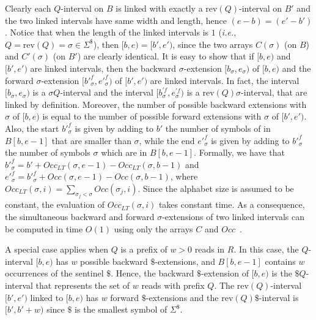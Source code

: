 \documentclass[runningheads,envcountsame,a4paper]{llncs}
\newcommand{\ie}{\textit{i.e.}\xspace}
\newcommand{\rev}{\ensuremath{\mathrm{rev}}}
\newcommand{\Occ}{\ensuremath{\textit{Occ}}}
\begin{document}
Clearly each $Q$-interval on $B$ is linked with exactly a
$\rev(Q)$-interval on $B'$ and the two linked intervals have same width
and length, hence $(e-b)=(e'-b')$.
Notice that when the length of the linked intervals is $1$ (\ie,
$Q=\rev(Q)=\sigma \in \Sigma^\$$), then $[b,e)=[b',e')$, since the two
arrays $C(\sigma)$ (on $B$) and $C'(\sigma)$ (on $B'$) are clearly identical.
It is easy to show that if $[b,e)$ and $[b',e')$ are linked
intervals, then the backward $\sigma$-extension
$[b_\sigma,e_\sigma)$ of $[b,e)$ and the forward $\sigma$-extension
$[{b'}^f_\sigma, {e'}^f_\sigma)$ of $[b',e')$ are linked intervals.
In fact, the interval $[b_\sigma, e_\sigma)$ is a $\sigma Q$-interval
and the interval $[b^{'f}_\sigma,e^{'f}_\sigma)$ is a
$\rev(Q) \sigma$-interval, that are linked by definition.
Moreover, the number of possible backward extensions with $\sigma$ of
$[b,e)$ is equal to the number of possible forward extensions with
$\sigma$ of $[b',e')$.
Also, the start ${b'}^f_\sigma$ is given by adding to $b'$ the number of
symbols of in $B[b, e-1]$ that are smaller than $\sigma$,
while the end ${e'}^f_\sigma$ is given by adding to ${b'}^f_\sigma$ the
number of symbols $\sigma$ which are in $B[b,e-1]$.
Formally, we have that
${b'}^f_\sigma = b' + \Occ_{LT}(\sigma, e-1) - \Occ_{LT}(\sigma, b-1)$
and
${e'}^f_\sigma = {b'}^f_\sigma + \Occ(\sigma, e-1) - \Occ(\sigma, b-1)$,
where
$\Occ_{LT}(\sigma, i) = \sum_{\sigma_j < \sigma} \Occ(\sigma_j, i)$.
Since the alphabet size is assumed to be constant, the evaluation of
$\Occ_{LT}(\sigma, i)$ takes constant time.
As a consequence, the simultaneous backward and forward
$\sigma$-extensions of two linked intervals can be computed in time
$O(1)$ using only the arrays $C$ and $\Occ$~\cite{Lam2009,Simpson2010}.



A special case applies when $Q$ is a prefix of $w > 0$ reads in $R$.
In this case, the $Q$-interval $[b,e)$ has $w$ possible backward
$\$$-extensions, and $B[b,e-1]$ contains $w$ occurrences of the sentinel
$\$$.
Hence, the backward $\$$-extension of $[b,e)$ is the $\$ Q$-interval
that represents the set of $w$ reads with prefix $Q$.
The $\rev(Q)$-interval $[b',e')$ linked to $[b,e)$ has $w$ forward
$\$$-extensions and the $\rev(Q) \$$-interval is $[b',b'+w)$ since $\$$
is the smallest symbol of $\Sigma^\$$.
\end{document}
